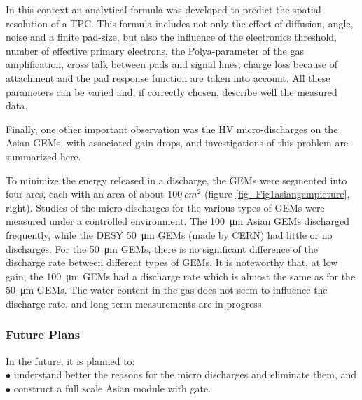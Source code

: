 In this context an analytical formula was developed to predict the spatial resolution of a TPC. This formula includes
not only the effect of diffusion, angle,
noise and a finite pad-size, but also the influence of the electronics threshold, number of effective primary electrons,
the Polya-parameter of the gas
amplification, cross talk between pads and signal lines, charge loss because of attachment and the pad response function
are taken into account. All
these parameters can be varied and, if correctly chosen, describe well the measured data.

Finally, one other important observation was the HV micro-discharges on the Asian GEMs, with associated gain drops,
and investigations of this problem are summarized here.

To minimize the energy released in a discharge, the GEMs were segmented into four arcs, each with an area of
about $\SI{100}{cm^2}$ (figure \ref{fig_Fig1asiangempicture}, right).
Studies of the micro-discharges for the various types of GEMs were measured under a controlled environment.
The \SI{100}{\micro\meter} Asian GEMs discharged frequently, while the DESY \SI{50}{\micro\meter} GEMs (made by CERN) had little or no
discharges. For the \SI{50}{\micro\meter} GEMs, there is no significant difference of
the discharge rate between different types of GEMs. It is noteworthy that, at low gain, the \SI{100}{\micro\meter} GEMs
had a discharge rate which is almost the same as for the \SI{50}{\micro\meter} GEMs. The water content in the gas does not seem to
influence the
discharge rate, and long-term measurements are in progress.


\subsubsection{Future Plans}

In the future, it is planned to:\\
$\bullet$ understand better the reasons for the micro discharges and eliminate them, and \\
$\bullet$ construct a full scale Asian module with gate.

